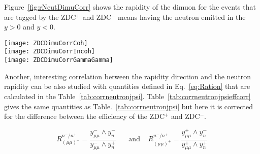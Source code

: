     Figure~\ref{fig:rNeutDimuCorr} shows the rapidity of the dimuon for the 
      events that are tagged by the ZDC$^{+}$ and  ZDC$^{-}$ means having 
      the neutron emitted in the $y>0$ and $y<0$. 
    
    \begin{figure*}[!Hhtb]
      \begin{center}
        \texttt{[image: ZDCDimuCorrCoh]}\\
        \texttt{[image: ZDCDimuCorrIncoh]}\\
        \texttt{[image: ZDCDimuCorrGammaGamma]}
        \caption{ \label{fig:rNeutDimuCorr} Rapidity distribution of \JPsi in the
          case of the events having the neutron in negative and positive rapidity 
          for the low-\pt \JPsi (top), high-\pt \JPsi (middle) and dimuons from
          $\gamma \gamma$ sample (bottom). }
      \end{center}
    \end{figure*}
    
    Another, interesting correlation between the \JPsi rapidity direction and 
      the neutron rapidity can be also studied with quantities defined in 
      Eq.~\ref{eq:Ration} that are calculated in the 
      Table~\ref{tab:corrneutronjpsi}. 
    Table~\ref{tab:corrneutronjpsieffcorr} gives the same quantities as  
      Table.~\ref{tab:corrneutronjpsi} but here it is corrected for the 
      difference between the efficiency of the ZDC$^{+}$ and  ZDC$^{-}$. 
    
    \begin{equation}
      \label{eq:Ration}
      R_{(\mu\mu)^{-}}^{n^{-}/n^{+}} =  \frac{y^{-}_{\mu\mu} \wedge 
        y_{n}^{-}}{y^{-}_{\mu\mu} \wedge y_{n}^{+} }~~~~~~~~\mbox{and}~~~~~
        R_{(\mu\mu)^{+}}^{n^{-}/n^{+}} =  \frac{y^{+}_{\mu\mu} \wedge 
        y_{n}^{-}}{y^{+}_{\mu\mu} \wedge y_{n}^{+} }
    \end{equation}
    
